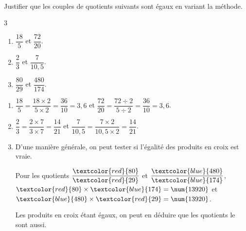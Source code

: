 \begin{exercice*}
    Justifier que les couples de quotients suivants sont égaux en variant la méthode.
    \begin{multicols}3
        \begin{enumerate}
            \item $\dfrac{18}{5}$ et $\dfrac{72}{20}$.
            \item $\dfrac{2}{3}$ et $\dfrac{7}{10,5}$.
            \item $\dfrac{80}{29}$ et $\dfrac{480}{174}$.
        \end{enumerate}
    \end{multicols}

\end{exercice*}
\begin{corrige}
    \begin{spacing}{2}
    \begin{enumerate}        
        \item $\dfrac{18}{5} = \dfrac{18\times 2}{5\times 2} = \dfrac{36}{10} = 3,6$ et $\dfrac{72}{20} = \dfrac{72\div 2}{5\div 2} = \dfrac{36}{10} = 3,6$.
        \item $\dfrac{2}{3} = \dfrac{2\times 7}{3\times 7} = \dfrac{14}{21}$ et $\dfrac{7}{10,5}= \dfrac{7\times 2}{10,5\times 2} = \dfrac{14}{21}$.
        \item D'une manière générale, on peut tester si l'égalité des produits en croix est vraie.        
        
        Pour les quotients $\dfrac{\textcolor{red}{80}}{\textcolor{red}{29}}$ et $\dfrac{\textcolor{blue}{480}}{\textcolor{blue}{174}}$, 
        $\textcolor{red}{80}\times \textcolor{blue}{174} = \num{13920}$ et $\textcolor{blue}{480}\times \textcolor{red}{29} = \num{13920}$.

        Les produits en croix étant égaux, on peut en déduire que les quotients le sont aussi.        
    \end{enumerate}
    \end{spacing}
\end{corrige}

